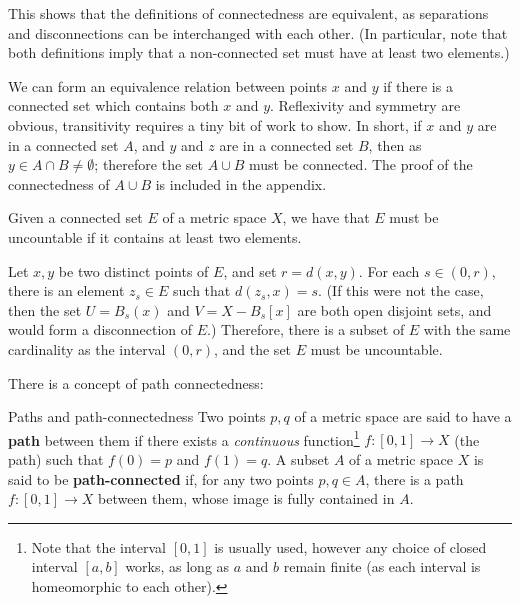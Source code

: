 This shows that the definitions of connectedness are equivalent, as separations and disconnections can be interchanged with each other. (In particular, note that both definitions imply that a non-connected set must have at least two elements.)

We can form an equivalence relation between points $x$ and $y$ if there is a connected set which contains both $x$ and $y$. Reflexivity and symmetry are obvious, transitivity requires a tiny bit of work to show. In short, if $x$ and $y$ are in a connected set $A$, and $y$ and $z$ are in a connected set $B$, then as $y\in A\cap B \neq \emptyset$; therefore the set $A\cup B$ must be connected. The proof of the connectedness of $A\cup B$ is included in the appendix.

\begin{bprop}{}{}
Given a connected set $E$ of a metric space $X$, we have that $E$ must be uncountable if it contains at least two elements.
\end{bprop}
\begin{bproof}{}{}
Let $x,y$ be two distinct points of $E$, and set \mbox{$r = d(x,y)$}. For each \mbox{$s\in (0,r)$}, there is an element \mbox{$z_{s}\in E$} such that \mbox{$d(z_{s},x) = s$}. (If this were not the case, then the set \mbox{$U = B_{s}(x)$} and \mbox{$V = X - B_{s}[x]$} are both open disjoint sets, and would form a disconnection of $E$.) Therefore, there is a subset of $E$ with the same cardinality as the interval $(0,r)$, and the set $E$ must be uncountable.
\eop
\end{bproof}

There is a concept of path connectedness:

\begin{bdefin}{Paths and path-connectedness}{}
Two points $p,q$ of a metric space are said to have a \textbf{path} between them if there exists a \emph{continuous} function\footnote{Note that the interval $[0,1]$ is usually used, however any choice of closed interval $[a,b]$ works, as long as $a$ and $b$ remain finite (as each interval is homeomorphic to each other).} $f : [0,1] \to X$ (the path) such that $f(0) = p$ and $f(1) = q$.
A subset $A$ of a metric space $X$ is said to be \textbf{path-connected} if, for any two points $p,q \in A$, there is a path $f : [0,1] \to X$ between them, whose image is fully contained in $A$.
\end{bdefin}

